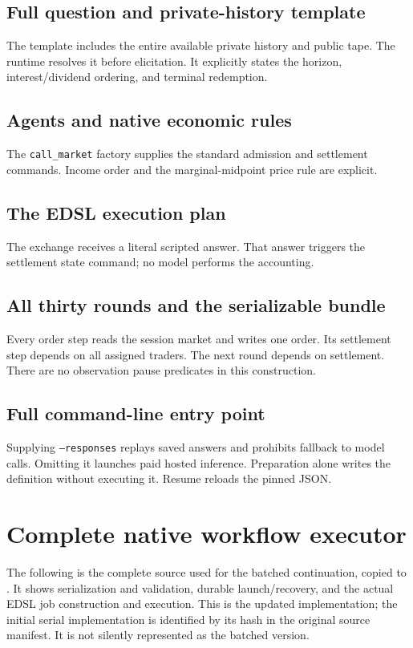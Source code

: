 \documentclass[11pt,letterpaper]{article}
\newcommand{\code}[1]{\texttt{\small #1}}
\begin{document}
\subsection{Full question and private-history template}
The template includes the entire available private history and public tape.
The runtime resolves it before elicitation. It explicitly states the horizon,
interest/dividend ordering, and terminal redemption.
\CodeQuestion

\subsection{Agents and native economic rules}
The \code{call\_market} factory supplies the standard admission and settlement
commands. Income order and the marginal-midpoint price rule are explicit.
\CodeMarket

\subsection{The EDSL execution plan}
The exchange receives a literal scripted answer. That answer triggers the
settlement state command; no model performs the accounting.
\CodePlan

\subsection{All thirty rounds and the serializable bundle}
Every order step reads the session market and writes one order. Its settlement
step depends on all assigned traders. The next round depends on settlement.
There are no observation pause predicates in this construction.
\CodeWorkflow

\subsection{Full command-line entry point}
Supplying \code{--responses} replays saved answers and prohibits fallback to
model calls. Omitting it launches paid hosted inference. Preparation alone
writes the definition without executing it. Resume reloads the pinned JSON.
\CodeRun

\clearpage
\section{Complete native workflow executor}\label{app:runtime}
The following is the complete  source used
for the batched continuation, copied to .
It shows serialization and validation, durable launch/recovery, and the actual
EDSL job construction and execution. This is the updated implementation; the
initial serial implementation is identified by its hash in the original
source manifest. It is not silently represented as the batched version.
\end{document}
